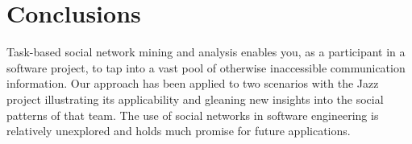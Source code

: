 \documentclass[12pt,oneside]{book}
\begin{document}
% 
% 




\section{Conclusions}
Task-based social network mining and analysis enables you, as a participant in a
software project, to tap into a vast pool of otherwise inaccessible communication
information. Our approach has been applied to two scenarios with the Jazz project
illustrating its applicability and gleaning new insights into the social patterns
of that team. The use of social networks in software engineering is relatively
unexplored and holds much promise for future applications.
\end{document}
